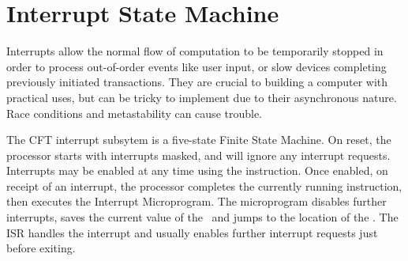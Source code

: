 



\section{Interrupt State Machine}
\label{sec:interrupts-state-machine}

Interrupts allow the normal flow of computation to be temporarily stopped in
order to process out-of-order events like user input, or slow devices
completing previously initiated transactions. They are crucial to building a
computer with practical uses, but can be tricky to implement due to their
asynchronous nature. Race conditions and metastability can cause trouble.

The CFT interrupt subsytem is a five-state Finite State Machine. On reset, the
processor starts with interrupts masked, and will ignore any interrupt
requests. Interrupts may be enabled at any time using the 
instruction. Once enabled, on receipt of an interrupt, the processor completes
the currently running instruction, then executes the Interrupt
Microprogram. The microprogram disables further interrupts, saves the current
value of the \PC~and jumps to the location of the . The ISR
handles the interrupt and usually enables further interrupt requests just
before exiting.

